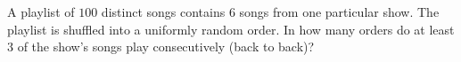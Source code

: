 A playlist of $100$ distinct songs contains $6$ songs from one particular show. The playlist is shuffled into a uniformly random order. In how many orders do at least $3$ of the show's songs play consecutively (back to back)?
